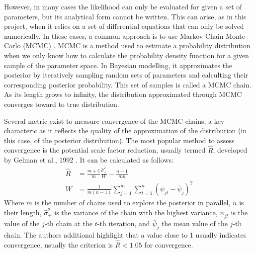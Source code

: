 \documentclass[11pt]{article}
\begin{document}
However, in many cases the likelihood can only be evaluated for given a set of parameters, but its analytical form cannot be written. This can arise, as in this project, when it relies on a set of differential equations that can only be solved numerically. In these cases, a common approach is to use Markov Chain Monte-Carlo (MCMC) \cite{mcmcTuto}. MCMC is a method used to estimate a probability distribution when we only know how to calculate the probability density function for a given sample of the parameter space. In Bayesian modelling, it approximates the posterior by iteratively sampling random sets of parameters and calculting their corresponding posterior probability. This set of samples is called a MCMC chain. As its length grows to infinity, the distribution approximated through MCMC converges toward to true distribution. 

Several metric exist to measure convergence of the MCMC chains, a key characteric as it reflects the quality of the approximation of the distribution \cite{moins2023use} (in this case, of the posterior distribution). The most popular method to assess convergence is the potential scale factor reduction, usually termed $\hat{R}$, developed by Gelman et al., 1992 \cite{rhat}. It can be calculated as follows:
\begin{align*}
    \hat{R} &= \frac{m+1}{m}\frac{\hat{\sigma}^2_+}{W}-\frac{n-1}{mn} \\ 
    W &= \frac{1}{m(n-1)}\sum^m_{j=1}\sum^n_{t=1}(\psi_{jt}-\bar{\psi}_j)^2 
\end{align*}
Where $m$ is the number of chains used to explore the posterior in parallel, $n$ is their length, $\hat{\sigma}^2_+$ is the variance of the chain with the highest variance, $\psi_{jt}$ is the value of the $j$-th chain at the $t$-th iteration, and $\bar{\psi}_j$ the mean value of the $j$-th chain. The authors additional highlight that a value close to 1 usually indicates convergence, usually the criterion is $\hat{R}<1.05$ for convergence.
\end{document}
